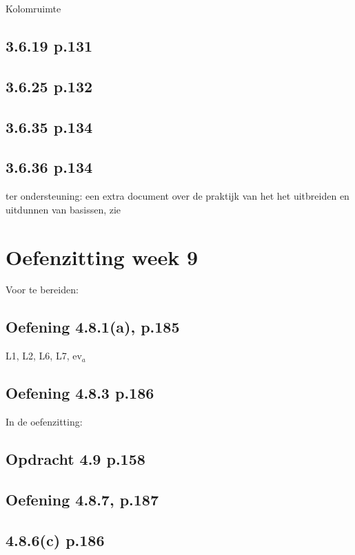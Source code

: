 \documentclass{article}
\begin{document}
Kolomruimte 

\subsection{3.6.19 p.131}

\subsection{3.6.25 p.132}

\subsection{3.6.35 p.134}

\subsection{3.6.36 p.134}


ter ondersteuning: een extra document over de praktijk van het het uitbreiden en uitdunnen van basissen, zie 


\section{Oefenzitting week 9} 

Voor te bereiden: 

\subsection{Oefening 4.8.1(a), p.185} 
L1, L2, L6, L7, ev$_a$

\subsection{Oefening 4.8.3 p.186} 


In de oefenzitting: 

\subsection{Opdracht 4.9 p.158}



\subsection*{Oefening 4.8.7, p.187}

\subsection*{4.8.6(c) p.186}
\end{document}
